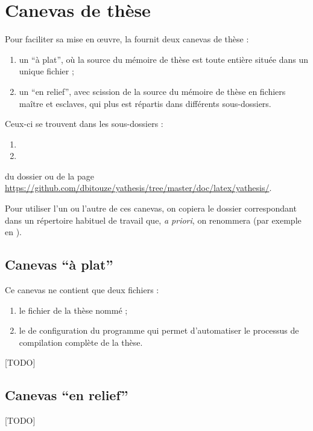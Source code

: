 \chapter{Canevas de thèse}\label{cha:canevas}

Pour faciliter sa mise en œuvre, la \yatcl fournit deux canevas de thèse :
\begin{enumerate}
\item un \enquote{à plat}, où la source  du mémoire de thèse est
  toute entière située dans un unique fichier ;
\item un \enquote{en relief}, avec scission de la source  du mémoire
  de thèse en fichiers maître et esclaves, qui plus est répartis dans
  différents sous-dossiers.
\end{enumerate}
Ceux-ci se trouvent dans les sous-dossiers :
\begin{enumerate}
\item {}
\item {}
\end{enumerate}
du dossier  ou de la page
\url{https://github.com/dbitouze/yathesis/tree/master/doc/latex/yathesis/}.

Pour utiliser l'un ou l'autre de ces canevas, on copiera le dossier
correspondant dans un répertoire habituel de travail que, \emph{a
  priori}, on renommera (par exemple en ).

\section{Canevas  \enquote{à plat}}
\label{sec:canevas-a-plat}

Ce canevas ne contient que deux fichiers :
\begin{enumerate}
\item le fichier de la thèse nommé  ;
\item le  de configuration du programme
   qui permet d'automatiser le processus de compilation
  complète de la thèse.
\end{enumerate}

[TODO]

\section{Canevas \enquote{en relief}}
\label{sec:canevas-relief}

[TODO]

%
\iffalse
\fi
